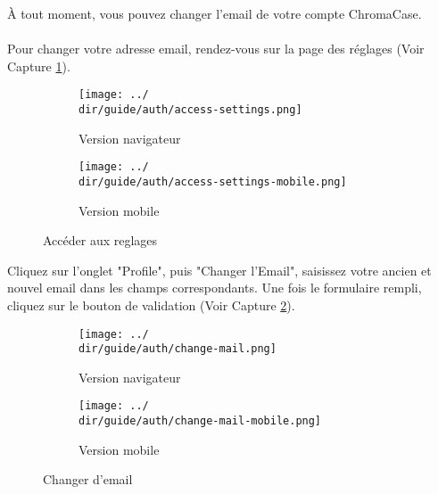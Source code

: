 À tout moment, vous pouvez changer l’email de votre compte ChromaCase.
\\\\
Pour changer votre adresse email, rendez-vous sur la page des réglages (Voir Capture \ref{fig:access-settings-mail}).

\begin{figure}[H]
	\begin{subfigure}[b]{0.7\textwidth}
		\texttt{[image: ../\\dir/guide/auth/access-settings.png]}
		\caption{Version navigateur}
	\end{subfigure}
	\begin{subfigure}[b]{0.25\textwidth}
		\texttt{[image: ../\\dir/guide/auth/access-settings-mobile.png]}
		\caption{Version mobile}
	\end{subfigure}
	\caption{Accéder aux reglages}
	\label{fig:access-settings-mail}
\end{figure}

Cliquez sur l'onglet "Profile", puis "Changer l'Email", saisissez votre ancien et nouvel email dans les champs correspondants. Une fois le formulaire rempli, cliquez sur le bouton de validation (Voir Capture \ref{fig:change-mail}).

\begin{figure}[H]
	\begin{subfigure}[b]{0.7\textwidth}
		\texttt{[image: ../\\dir/guide/auth/change-mail.png]}
		\caption{Version navigateur}
	\end{subfigure}
	\begin{subfigure}[b]{0.25\textwidth}
		\texttt{[image: ../\\dir/guide/auth/change-mail-mobile.png]}
		\caption{Version mobile}
	\end{subfigure}
	\caption{Changer d'email}
	\label{fig:change-mail}
\end{figure}